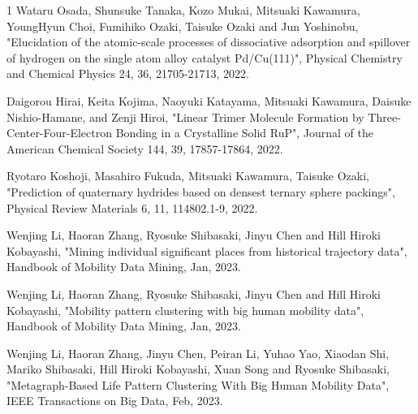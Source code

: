 \begin{雑誌論文}{1}
Wataru Osada, Shunsuke Tanaka, Kozo Mukai, Mitsuaki Kawamura, YoungHyun Choi, Fumihiko Ozaki, Taisuke Ozaki and Jun Yoshinobu, 
"Elucidation of the atomic-scale processes of dissociative adsorption and spillover of hydrogen on the single atom alloy catalyst Pd/Cu(111)",
Physical Chemistry and Chemical Physics 24, 36, 21705-21713, 2022.

Daigorou Hirai, Keita Kojima, Naoyuki Katayama, Mitsuaki Kawamura, Daisuke Nishio-Hamane, and Zenji Hiroi,
"Linear Trimer Molecule Formation by Three-Center-Four-Electron Bonding in a Crystalline Solid RuP",
Journal of the American Chemical Society 144, 39, 17857-17864, 2022.

Ryotaro Koshoji, Masahiro Fukuda, Mitsuaki Kawamura, Taisuke Ozaki,
"Prediction of quaternary hydrides based on densest ternary sphere packings",
Physical Review Materials 6, 11, 114802.1-9, 2022.

Wenjing Li, Haoran Zhang, Ryosuke Shibasaki,  Jinyu Chen and Hill Hiroki Kobayashi,  "Mining individual significant places from historical trajectory data", Handbook of Mobility Data Mining, Jan, 2023.

Wenjing Li, Haoran Zhang, Ryosuke Shibasaki,  Jinyu Chen and Hill Hiroki Kobayashi,  "Mobility pattern clustering with big human mobility data", Handbook of Mobility Data Mining, Jan, 2023.

Wenjing Li, Haoran Zhang, Jinyu Chen, Peiran Li, Yuhao Yao, Xiaodan Shi,  Mariko Shibasaki, Hill Hiroki Kobayashi, Xuan Song and Ryosuke Shibasaki,  "Metagraph-Based Life Pattern Clustering With Big Human Mobility Data", IEEE Transactions on Big Data, Feb, 2023.


\end{雑誌論文}
